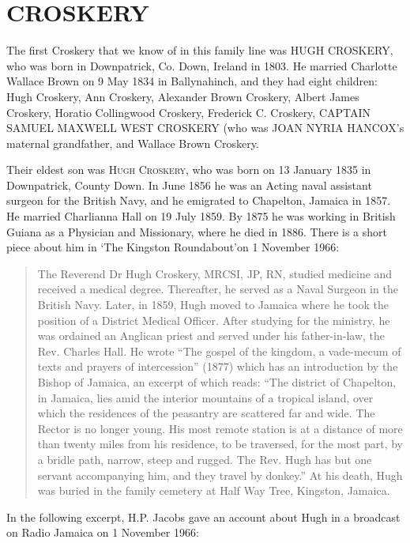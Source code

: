 \section{CROSKERY}

The first Croskery that we know of in this family line was \uppercase{Hugh Croskery}, who was born in Downpatrick, Co. Down, Ireland in 1803.  He married Charlotte Wallace Brown on 9 May 1834 in Ballynahinch,  and they had eight children: Hugh Croskery, Ann Croskery, Alexander Brown Croskery, Albert James Croskery, Horatio Collingwood Croskery, Frederick C. Croskery, \uppercase{Captain Samuel Maxwell West Croskery} (who was \uppercase{Joan Nyria Hancox}'s maternal grandfather, and Wallace Brown Croskery.

Their eldest son was \textsc{Hugh Croskery},  who was born on 13 January 1835 in Downpatrick, County Down. In June 1856 he was an Acting naval assistant surgeon for the British Navy, and he emigrated to Chapelton, Jamaica in 1857.  He married Charlianna Hall on 19 July 1859. By 1875 he was working in British Guiana as a Physician and Missionary, where he died in 1886. There is a short piece about him in `The Kingston Roundabout'on 1 November 1966:
\begin{quotation}
The Reverend Dr Hugh Croskery, MRCSI, JP, RN, studied medicine and received a medical degree. Thereafter, he served as a Naval Surgeon in the British Navy. Later, in 1859, Hugh moved to Jamaica where he took the position of a District Medical Officer. After studying for the ministry, he was ordained an Anglican priest and served under his father-in-law, the Rev. Charles Hall. He wrote ``The gospel of the kingdom, a vade-mecum of texts and prayers of intercession'' (1877) which has an introduction by the Bishop of Jamaica, an excerpt of which reads: ``The district of Chapelton, in Jamaica, lies amid the interior mountains of a tropical island, over which the residences of the peasantry are scattered far and wide. The Rector is no longer young. His most remote station is at a distance of more than twenty miles from his residence, to be traversed, for the most part, by a bridle path, narrow, steep and rugged. The Rev. Hugh has but one servant accompanying him, and they travel by donkey.'' At his death, Hugh was buried in the family cemetery at Half Way Tree, Kingston, Jamaica.
\end{quotation}
In the following excerpt, H.P. Jacobs gave an account about Hugh in a broadcast on Radio Jamaica on 1 November 1966:
